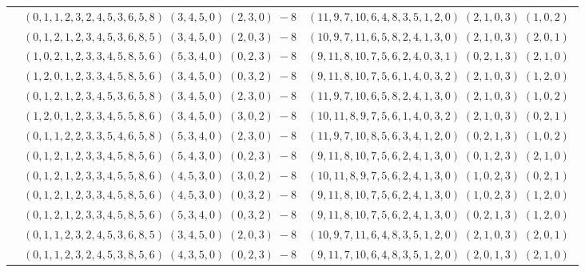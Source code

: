 \documentclass[11pt]{article}
\begin{document}
\begin{longtable}[l]{|c|c|c|}
 \cline{2-3} 
 & $(0 ,1 ,1 ,2 ,3 ,2 ,4 ,5 ,3 ,6 ,5 ,8) \;(3 ,4 ,5 ,0) \;(2 ,3 ,0) \;-8$ & $(11 ,9 ,7 ,10 ,6 ,4 ,8 ,3 ,5 ,1 ,2 ,0) \;(2 ,1 ,0 ,3) \;(1 ,0 ,2) \;$\\ 
 \cline{2-3} 
 & $(0 ,1 ,2 ,1 ,2 ,3 ,4 ,5 ,3 ,6 ,8 ,5) \;(3 ,4 ,5 ,0) \;(2 ,0 ,3) \;-8$ & $(10 ,9 ,7 ,11 ,6 ,5 ,8 ,2 ,4 ,1 ,3 ,0) \;(2 ,1 ,0 ,3) \;(2 ,0 ,1) \;$\\ 
 \cline{2-3} 
 & $(1 ,0 ,2 ,1 ,2 ,3 ,3 ,4 ,5 ,8 ,5 ,6) \;(5 ,3 ,4 ,0) \;(0 ,2 ,3) \;-8$ & $(9 ,11 ,8 ,10 ,7 ,5 ,6 ,2 ,4 ,0 ,3 ,1) \;(0 ,2 ,1 ,3) \;(2 ,1 ,0) \;$\\ 
 \cline{2-3} 
 & $(1 ,2 ,0 ,1 ,2 ,3 ,3 ,4 ,5 ,8 ,5 ,6) \;(3 ,4 ,5 ,0) \;(0 ,3 ,2) \;-8$ & $(9 ,11 ,8 ,10 ,7 ,5 ,6 ,1 ,4 ,0 ,3 ,2) \;(2 ,1 ,0 ,3) \;(1 ,2 ,0) \;$\\ 
 \cline{2-3} 
 & $(0 ,1 ,2 ,1 ,2 ,3 ,4 ,5 ,3 ,6 ,5 ,8) \;(3 ,4 ,5 ,0) \;(2 ,3 ,0) \;-8$ & $(11 ,9 ,7 ,10 ,6 ,5 ,8 ,2 ,4 ,1 ,3 ,0) \;(2 ,1 ,0 ,3) \;(1 ,0 ,2) \;$\\ 
 \cline{2-3} 
 & $(1 ,2 ,0 ,1 ,2 ,3 ,3 ,4 ,5 ,5 ,8 ,6) \;(3 ,4 ,5 ,0) \;(3 ,0 ,2) \;-8$ & $(10 ,11 ,8 ,9 ,7 ,5 ,6 ,1 ,4 ,0 ,3 ,2) \;(2 ,1 ,0 ,3) \;(0 ,2 ,1) \;$\\ 
 \cline{2-3} 
 & $(0 ,1 ,1 ,2 ,2 ,3 ,3 ,5 ,4 ,6 ,5 ,8) \;(5 ,3 ,4 ,0) \;(2 ,3 ,0) \;-8$ & $(11 ,9 ,7 ,10 ,8 ,5 ,6 ,3 ,4 ,1 ,2 ,0) \;(0 ,2 ,1 ,3) \;(1 ,0 ,2) \;$\\ 
 \cline{2-3} 
 & $(0 ,1 ,2 ,1 ,2 ,3 ,3 ,4 ,5 ,8 ,5 ,6) \;(5 ,4 ,3 ,0) \;(0 ,2 ,3) \;-8$ & $(9 ,11 ,8 ,10 ,7 ,5 ,6 ,2 ,4 ,1 ,3 ,0) \;(0 ,1 ,2 ,3) \;(2 ,1 ,0) \;$\\ 
 \cline{2-3} 
 & $(0 ,1 ,2 ,1 ,2 ,3 ,3 ,4 ,5 ,5 ,8 ,6) \;(4 ,5 ,3 ,0) \;(3 ,0 ,2) \;-8$ & $(10 ,11 ,8 ,9 ,7 ,5 ,6 ,2 ,4 ,1 ,3 ,0) \;(1 ,0 ,2 ,3) \;(0 ,2 ,1) \;$\\ 
 \cline{2-3} 
 & $(0 ,1 ,2 ,1 ,2 ,3 ,3 ,4 ,5 ,8 ,5 ,6) \;(4 ,5 ,3 ,0) \;(0 ,3 ,2) \;-8$ & $(9 ,11 ,8 ,10 ,7 ,5 ,6 ,2 ,4 ,1 ,3 ,0) \;(1 ,0 ,2 ,3) \;(1 ,2 ,0) \;$\\ 
 \cline{2-3} 
 & $(0 ,1 ,2 ,1 ,2 ,3 ,3 ,4 ,5 ,8 ,5 ,6) \;(5 ,3 ,4 ,0) \;(0 ,3 ,2) \;-8$ & $(9 ,11 ,8 ,10 ,7 ,5 ,6 ,2 ,4 ,1 ,3 ,0) \;(0 ,2 ,1 ,3) \;(1 ,2 ,0) \;$\\ 
 \cline{2-3} 
 & $(0 ,1 ,1 ,2 ,3 ,2 ,4 ,5 ,3 ,6 ,8 ,5) \;(3 ,4 ,5 ,0) \;(2 ,0 ,3) \;-8$ & $(10 ,9 ,7 ,11 ,6 ,4 ,8 ,3 ,5 ,1 ,2 ,0) \;(2 ,1 ,0 ,3) \;(2 ,0 ,1) \;$\\ 
 \cline{2-3} 
 & $(0 ,1 ,1 ,2 ,3 ,2 ,4 ,5 ,3 ,8 ,5 ,6) \;(4 ,3 ,5 ,0) \;(0 ,2 ,3) \;-8$ & $(9 ,11 ,7 ,10 ,6 ,4 ,8 ,3 ,5 ,1 ,2 ,0) \;(2 ,0 ,1 ,3) \;(2 ,1 ,0) \;$\\ 

\end{longtable}
\end{document}
